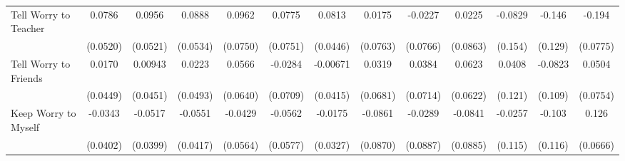 {\begin{tabular}{l*{12}{c}}
\addlinespace
Tell Worry to Teacher&      0.0786         &      0.0956         &      0.0888         &      0.0962         &      0.0775         &      0.0813         &      0.0175         &     -0.0227         &      0.0225         &     -0.0829         &      -0.146         &      -0.194\sym{*}  \\
            &    (0.0520)         &    (0.0521)         &    (0.0534)         &    (0.0750)         &    (0.0751)         &    (0.0446)         &    (0.0763)         &    (0.0766)         &    (0.0863)         &     (0.154)         &     (0.129)         &    (0.0775)         \\
\addlinespace
Tell Worry to Friends&      0.0170         &     0.00943         &      0.0223         &      0.0566         &     -0.0284         &    -0.00671         &      0.0319         &      0.0384         &      0.0623         &      0.0408         &     -0.0823         &      0.0504         \\
            &    (0.0449)         &    (0.0451)         &    (0.0493)         &    (0.0640)         &    (0.0709)         &    (0.0415)         &    (0.0681)         &    (0.0714)         &    (0.0622)         &     (0.121)         &     (0.109)         &    (0.0754)         \\
\addlinespace
Keep Worry to Myself&     -0.0343         &     -0.0517         &     -0.0551         &     -0.0429         &     -0.0562         &     -0.0175         &     -0.0861         &     -0.0289         &     -0.0841         &     -0.0257         &      -0.103         &       0.126         \\
            &    (0.0402)         &    (0.0399)         &    (0.0417)         &    (0.0564)         &    (0.0577)         &    (0.0327)         &    (0.0870)         &    (0.0887)         &    (0.0885)         &     (0.115)         &     (0.116)         &    (0.0666)         \\
\bottomrule
\end{tabular}
}

